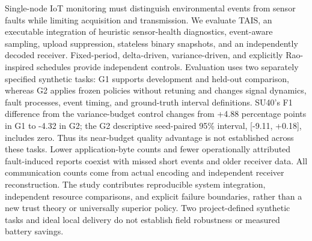 Single-node IoT monitoring must distinguish environmental events from sensor faults while limiting acquisition and transmission. We evaluate TAIS, an executable integration of heuristic sensor-health diagnostics, event-aware sampling, upload suppression, stateless binary snapshots, and an independently decoded receiver. Fixed-period, delta-driven, variance-driven, and explicitly Rao-inspired schedules provide independent controls. Evaluation uses two separately specified synthetic tasks: G1 supports development and held-out comparison, whereas G2 applies frozen policies without retuning and changes signal dynamics, fault processes, event timing, and ground-truth interval definitions. SU40's F1 difference from the variance-budget control changes from +4.88 percentage points in G1 to -4.32 in G2; the G2 descriptive seed-paired 95\% interval, [-9.11, +0.18], includes zero. Thus its near-budget quality advantage is not established across these tasks. Lower application-byte counts and fewer operationally attributed fault-induced reports coexist with missed short events and older receiver data. All communication counts come from actual encoding and independent receiver reconstruction. The study contributes reproducible system integration, independent resource comparisons, and explicit failure boundaries, rather than a new trust theory or universally superior policy. Two project-defined synthetic tasks and ideal local delivery do not establish field robustness or measured battery savings.
